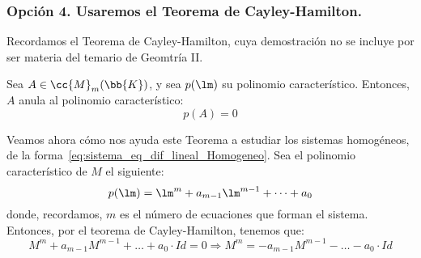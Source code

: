 \begin{ejemplo}
\begin{comment}
            =\\&= 3^{n-1}\left(\begin{matrix}
            {\left(-1\right)^n+2} & {-\left(-1\right)^n+1}\\
            {-2\cdot\left(-1\right)^n+2} & {2\cdot\left(-1\right)^n+1}
            \end{matrix}\right)
            X_0
            =\\&= 3^{n-1}\left(\begin{matrix}
            {\left(-1\right)^n+2} & {\left(-1\right)^{n-1}+1}\\
            {2\cdot\left(-1\right)^{n-1}+2} & {2\cdot\left(-1\right)^n+1}
            \end{matrix}\right)
            X_0
        \end{align*}
        \end{comment}
\end{ejemplo}


\subsubsection{Opción 4. Usaremos el Teorema de Cayley-Hamilton.}

Recordamos el Teorema de Cayley-Hamilton, cuya demostración no se incluye por ser materia del temario de Geomtría II.
\begin{teo} 
    Sea $A\in\cc{M}_m(\bb{K})$, y sea $p(\lm)$ su polinomio característico. Entonces, $A$ anula al polinomio característico:
    \begin{equation*}
        p(A) = 0
    \end{equation*}
\end{teo}

Veamos ahora cómo nos ayuda este Teorema a estudiar los sistemas homogéneos, de la forma~\ref{eq:sistema_eq_dif_lineal_Homogeneo}. Sea el polinomio característico de $M$ el siguiente:
\begin{equation*}
    p(\lm) = \lm^m +a_{m-1}\lm^{m-1} + \dots + a_0
\end{equation*}
donde, recordamos, $m$ es el número de ecuaciones que forman el sistema.
Entonces, por el teorema de Cayley-Hamilton, tenemos que:
\begin{equation*}
    M^m + a_{m-1}M^{m-1} + \dots + a_0\cdot Id = 0
    \Longrightarrow
    M^m = -a_{m-1}M^{m-1} - \dots - a_0\cdot Id
\end{equation*}

